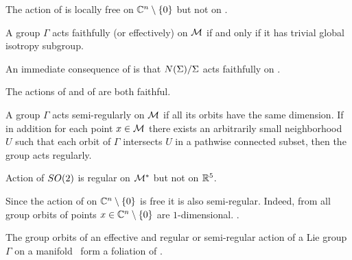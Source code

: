 \begin{example}
The action  of  is locally free on $\mathbb{C}^{n}\setminus\{0\}$ but not on .
\end{example}

\begin{definition}
\label{def:faithfull}
A group $\Gamma$ acts faithfully (or effectively) on $\mathcal{M}$ if and only if it has trivial global isotropy subgroup.
\end{definition}

An immediate consequence of  is that $N(\Sigma)/\Sigma$ acts faithfully on \Fix{\Sigma}.


\begin{example}
 The actions  of  and  of  are both faithful.
\end{example}

\begin{definition}
\label{def:regular}
A group $\Gamma$ acts semi-regularly on $\mathcal{M}$ if all its orbits have the same dimension.
If in addition for each point $x\in \mathcal{M}$
there exists an arbitrarily small neighborhood $U$ such that each orbit of $\Gamma$ intersects $U$ in a pathwise connected subset, then the group
acts regularly.
\end{definition}

\begin{example}
 Action  of $SO(2)$ is regular on $\mathcal{M}^*$ but not on $\mathbb{R}^{5}$.
\end{example}


\begin{example}
Since the action  of  on $\mathbb{C}^{n}\setminus\{0\}$ is free it is also semi-regular. Indeed, from  all group orbits of points $x\in\mathbb{C}^{n}\setminus\{0\}$ are $1$-dimensional.
.
\end{example}

The group orbits of an effective and regular or semi-regular action of a Lie group $\Gamma$ on a manifold \Manif\ form a foliation of \Manif{}.






